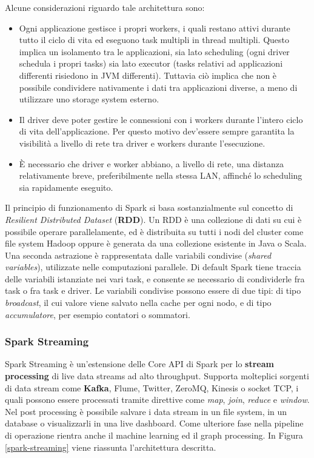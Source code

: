 \documentclass[11pt]{article}
\begin{document}
Alcune considerazioni riguardo tale architettura sono: 
\begin{itemize}
	\item Ogni applicazione gestisce i propri workers, i quali restano attivi durante tutto il ciclo di vita ed eseguono task multipli in thread multipli. Questo implica un isolamento tra le applicazioni, sia lato scheduling (ogni driver schedula i propri tasks) sia lato executor (tasks relativi ad applicazioni differenti risiedono in JVM differenti). Tuttavia ciò implica che non è possibile condividere nativamente i dati tra applicazioni diverse, a meno di utilizzare uno storage system esterno.
	\item Il driver deve poter gestire le connessioni con i workers durante l'intero ciclo di vita dell'applicazione. Per questo motivo dev'essere sempre garantita la visibilità a livello di rete tra driver e workers durante l'esecuzione.
	\item \`E necessario che driver e worker abbiano, a livello di rete, una distanza relativamente breve, preferibilmente nella stessa LAN, affinché lo scheduling sia rapidamente eseguito. 
\end{itemize}

Il principio di funzionamento di Spark si basa sostanzialmente sul concetto di \textit{Resilient Distributed Dataset} (\textbf{RDD}). Un RDD è una collezione di dati su cui è possibile operare parallelamente, ed è distribuita su tutti i nodi del cluster come file system Hadoop oppure è generata da una collezione esistente in Java o Scala. \\

Una seconda astrazione è rappresentata dalle variabili condivise (\textit{shared variables}), utilizzate nelle computazioni parallele. Di default Spark tiene traccia delle variabili istanziate nei vari task, e consente se necessario di condividerle fra task o fra task e driver. Le variabili condivise possono essere di due tipi: di tipo \textit{broadcast}, il cui valore viene salvato nella cache per ogni nodo, e di tipo \textit{accumulatore}, per esempio contatori o sommatori.

\subsubsection{Spark Streaming}

Spark Streaming è un'estensione delle Core API di Spark per lo\textbf{ stream processing} di live data streams ad alto throughput. Supporta molteplici sorgenti di data stream come\textbf{ Kafka}, Flume, Twitter, ZeroMQ, Kinesis o socket TCP, i quali possono essere processati tramite direttive come \textit{map}, \textit{join}, \textit{reduce} e \textit{window}. Nel post processing è possibile salvare i data stream in un file system, in un database o visualizzarli in una live dashboard. Come ulteriore fase nella pipeline di operazione rientra anche il machine learning ed il graph processing. In Figura \ref{spark-streaming} viene riassunta l'architettura descritta. 
\end{document}

